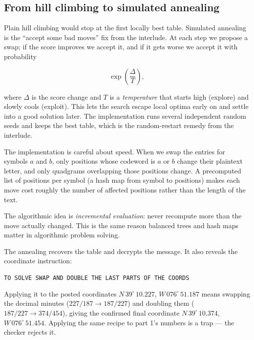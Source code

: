 \documentclass[11pt]{article}
\begin{document}
\subsection{From hill climbing to simulated annealing}

Plain hill climbing would stop at the first locally best table.  Simulated
annealing is the ``accept some bad moves'' fix from the interlude.  At each
step we propose a swap; if the score improves we accept it, and if it gets
worse we accept it with probability

\begin{equation}
\exp\!\left(\frac{\Delta}{T}\right),
\end{equation}

where $\Delta$ is the score change and $T$ is a \emph{temperature} that starts
high (explore) and slowly cools (exploit).  This lets the search escape local
optima early on and settle into a good solution later.  The implementation
runs several independent random seeds and keeps the best table, which is the
random-restart remedy from the interlude.

The implementation is careful about speed.  When we swap the entries for
symbols $a$ and $b$, only positions whose codeword is $a$ or $b$ change their
plaintext letter, and only quadgrams overlapping those positions change.  A
precomputed list of positions per symbol (a hash map from symbol to positions)
makes each move cost roughly the number of affected positions rather than the
length of the text.

\begin{lesson}
The algorithmic idea is \emph{incremental evaluation}: never recompute more
than the move actually changed.  This is the same reason balanced trees and
hash maps matter in algorithmic problem solving.
\end{lesson}

The annealing recovers the table and decrypts the message.  It also reveals the
coordinate instruction:

\begin{center}
\texttt{TO SOLVE SWAP AND DOUBLE THE LAST PARTS OF THE COORDS}
\end{center}

Applying it to the posted coordinates $N\,39^\circ\,10.227$, $W\,076^\circ\,
51.187$ means swapping the decimal minutes ($227/187 \to 187/227$) and
doubling them ($187/227 \to 374/454$), giving the confirmed final coordinate
$N\,39^\circ\,10.374$, $W\,076^\circ\,51.454$.  Applying the same recipe to
part 1's numbers is a trap --- the checker rejects it.
\end{document}
